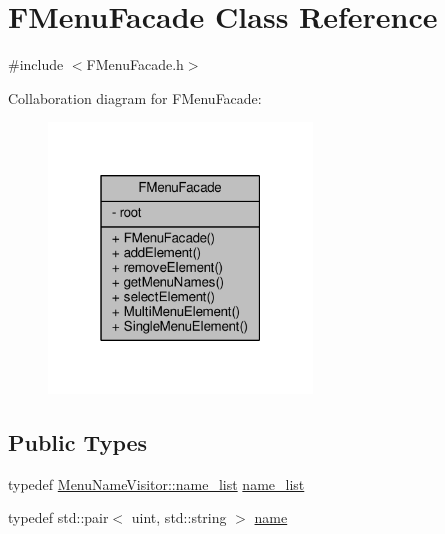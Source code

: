 \hypertarget{classFMenuFacade}{}\section{F\+Menu\+Facade Class Reference}
\label{classFMenuFacade}


{\ttfamily \#include $<$F\+Menu\+Facade.\+h$>$}



Collaboration diagram for F\+Menu\+Facade\+:
\nopagebreak
\begin{figure}[H]
\begin{center}
\leavevmode
\includegraphics[width=199pt]{classFMenuFacade__coll__graph}
\end{center}
\end{figure}
\subsection*{Public Types}
\begin{DoxyCompactItemize}
\item 
typedef \hyperlink{classMenuNameVisitor_a8feb2ed73ab4a09c56a7f87ddd2d0478}{Menu\+Name\+Visitor\+::name\+\_\+list} \hyperlink{classFMenuFacade_a45d184d76216f6ce15b1b8b2fb4febb1}{name\+\_\+list}
\item 
typedef std\+::pair$<$ uint, std\+::string $>$ \hyperlink{classFMenuFacade_ad7061aee91a27742df50a0ee7c0201d2}{name}
\end{DoxyCompactItemize}
